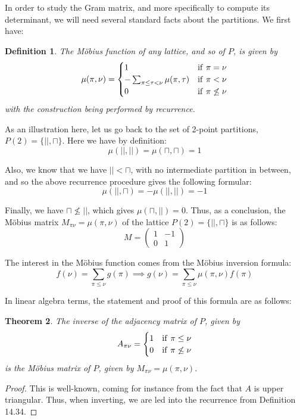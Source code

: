 \documentclass[12pt]{amsbook}
\newtheorem{theorem}{Theorem}[chapter]
\newtheorem{definition}[theorem]{Definition}
\begin{document}
In order to study the Gram matrix, and more specifically to compute its determinant, we will need several standard facts about the partitions. We first have:


\begin{definition}
The M\"obius function of any lattice, and so of $P$, is given by
$$\mu(\pi,\nu)=\begin{cases}
1&{\rm if}\ \pi=\nu\\
-\sum_{\pi\leq\tau<\nu}\mu(\pi,\tau)&{\rm if}\ \pi<\nu\\
0&{\rm if}\ \pi\not\leq\nu
\end{cases}$$
with the construction being performed by recurrence.
\end{definition}

As an illustration here, let us go back to the set of 2-point partitions, $P(2)=\{||,\sqcap\}$. Here we have by definition:
$$\mu(||,||)=\mu(\sqcap,\sqcap)=1$$

Also, we know that we have $||<\sqcap$, with no intermediate partition in between, and so the above recurrence procedure gives the following formular:
$$\mu(||,\sqcap)=-\mu(||,||)=-1$$

Finally, we have $\sqcap\not\leq||$, which gives $\mu(\sqcap,||)=0$. Thus, as a conclusion, the M\"obius matrix $M_{\pi\nu}=\mu(\pi,\nu)$ of the lattice $P(2)=\{||,\sqcap\}$ is as follows:
$$M=\begin{pmatrix}1&-1\\ 0&1\end{pmatrix}$$

The interest in the M\"obius function comes from the M\"obius inversion formula:
$$f(\nu)=\sum_{\pi\leq\nu}g(\pi)\implies g(\nu)=\sum_{\pi\leq\nu}\mu(\pi,\nu)f(\pi)$$

In linear algebra terms, the statement and proof of this formula are as follows:


\begin{theorem}
The inverse of the adjacency matrix of $P$, given by
$$A_{\pi\nu}=\begin{cases}
1&{\rm if}\ \pi\leq\nu\\
0&{\rm if}\ \pi\not\leq\nu
\end{cases}$$
is the M\"obius matrix of $P$, given by $M_{\pi\nu}=\mu(\pi,\nu)$.
\end{theorem}

\begin{proof}
This is well-known, coming for instance from the fact that $A$ is upper triangular. Thus, when inverting, we are led into the recurrence from Definition 14.34.
\end{proof}
\end{document}
